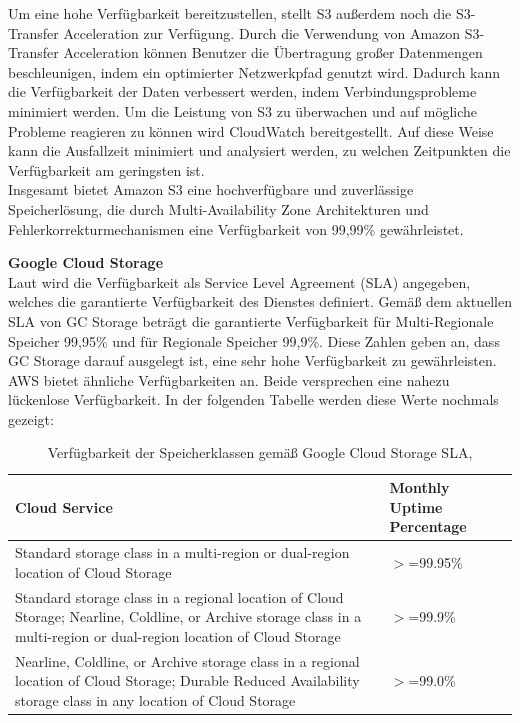 Um eine hohe Verfügbarkeit bereitzustellen, stellt S3 außerdem noch die S3-Transfer Acceleration zur Verfügung. Durch die Verwendung von Amazon S3-Transfer Acceleration können Benutzer die Übertragung großer Datenmengen beschleunigen, indem ein optimierter Netzwerkpfad genutzt wird. Dadurch kann die Verfügbarkeit der Daten verbessert werden, indem Verbindungsprobleme minimiert werden. Um die Leistung von S3 zu überwachen und auf mögliche Probleme reagieren zu können wird CloudWatch bereitgestellt. Auf diese Weise kann die Ausfallzeit minimiert und analysiert werden, zu welchen Zeitpunkten die Verfügbarkeit am geringsten ist.\\

Insgesamt bietet Amazon S3 eine hochverfügbare und zuverlässige Speicherlösung, die durch Multi-Availability Zone Architekturen und Fehlerkorrekturmechanismen eine Verfügbarkeit von 99,99\% gewährleistet.

\newpage

\textbf{Google Cloud Storage}\\

Laut \cite{gcp-sla} wird die Verfügbarkeit als Service Level Agreement (SLA) angegeben, welches die garantierte Verfügbarkeit des Dienstes definiert. Gemäß dem aktuellen SLA von GC Storage beträgt die garantierte Verfügbarkeit für Multi-Regionale Speicher 99,95\% und für Regionale Speicher 99,9\%. Diese Zahlen geben an, dass GC Storage darauf ausgelegt ist, eine sehr hohe Verfügbarkeit zu gewährleisten. AWS bietet ähnliche Verfügbarkeiten an. Beide versprechen eine nahezu lückenlose Verfügbarkeit. In der folgenden Tabelle werden diese Werte nochmals gezeigt:

\begin{table}[!h]
\centering
\begin{tabular}{ |p{5cm}|p{5cm}| }
\hline
Cloud Service & Monthly Uptime Percentage \\
\hline
\cline{1-2}
Standard storage class in a multi-region or dual-region location of Cloud Storage & $>$=99.95\% \\
\cline{1-2}
Standard storage class in a regional location of Cloud Storage; Nearline, Coldline, or Archive storage class in a multi-region or dual-region location of Cloud Storage & $>$=99.9\% \\
\cline{1-2}
Nearline, Coldline, or Archive storage class in a regional location of Cloud Storage; Durable Reduced Availability storage class in any location of Cloud Storage & $>$=99.0\% \\
\cline{1-2}
\end{tabular}
\caption{Verfügbarkeit der Speicherklassen gemäß Google Cloud Storage SLA, }
\end{table}


